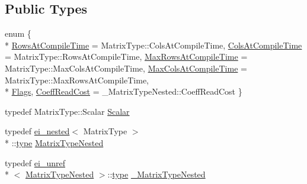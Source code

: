 \subsection*{Public Types}
\begin{DoxyCompactItemize}
\item 
enum \{ \\*
\hyperlink{structei__traits_3_01_transpose_3_01_matrix_type_01_4_01_4_af510049307442360ac1af47d58259d09a2a9a933a3a9381fe11a80266195ffe0d}{Rows\-At\-Compile\-Time} = Matrix\-Type\-:\-:Cols\-At\-Compile\-Time, 
\hyperlink{structei__traits_3_01_transpose_3_01_matrix_type_01_4_01_4_af510049307442360ac1af47d58259d09ac3f0fca7f27edb224112af41dbf69bf5}{Cols\-At\-Compile\-Time} = Matrix\-Type\-:\-:Rows\-At\-Compile\-Time, 
\hyperlink{structei__traits_3_01_transpose_3_01_matrix_type_01_4_01_4_af510049307442360ac1af47d58259d09aae18d32ae63b9e9e8cd8137bde305a16}{Max\-Rows\-At\-Compile\-Time} = Matrix\-Type\-:\-:Max\-Cols\-At\-Compile\-Time, 
\hyperlink{structei__traits_3_01_transpose_3_01_matrix_type_01_4_01_4_af510049307442360ac1af47d58259d09ab389d9075c9d803c5101c81ab5209226}{Max\-Cols\-At\-Compile\-Time} = Matrix\-Type\-:\-:Max\-Rows\-At\-Compile\-Time, 
\\*
\hyperlink{structei__traits_3_01_transpose_3_01_matrix_type_01_4_01_4_af510049307442360ac1af47d58259d09aabdc147198423579142d8401a00ba131}{Flags}, 
\hyperlink{structei__traits_3_01_transpose_3_01_matrix_type_01_4_01_4_af510049307442360ac1af47d58259d09a0e39175a4cfb6d431cc1851aba9a8906}{Coeff\-Read\-Cost} = \-\_\-\-Matrix\-Type\-Nested\-:\-:Coeff\-Read\-Cost
 \}
\item 
typedef Matrix\-Type\-::\-Scalar \hyperlink{structei__traits_3_01_transpose_3_01_matrix_type_01_4_01_4_a2dcd945e68ae91111c199fb06320c597}{Scalar}
\item 
typedef \hyperlink{structei__nested}{ei\-\_\-nested}$<$ Matrix\-Type $>$\\*
\-::\hyperlink{glext_8h_a7d05960f4f1c1b11f3177dc963a45d86}{type} \hyperlink{structei__traits_3_01_transpose_3_01_matrix_type_01_4_01_4_a35db65ef32b6a264892beb1060f8fe4a}{Matrix\-Type\-Nested}
\item 
typedef \hyperlink{structei__unref}{ei\-\_\-unref}\\*
$<$ \hyperlink{structei__traits_3_01_transpose_3_01_matrix_type_01_4_01_4_a35db65ef32b6a264892beb1060f8fe4a}{Matrix\-Type\-Nested} $>$\-::\hyperlink{glext_8h_a7d05960f4f1c1b11f3177dc963a45d86}{type} \hyperlink{structei__traits_3_01_transpose_3_01_matrix_type_01_4_01_4_a77d81108d2f1302dbf2b34671fc5ba93}{\-\_\-\-Matrix\-Type\-Nested}
\end{DoxyCompactItemize}



